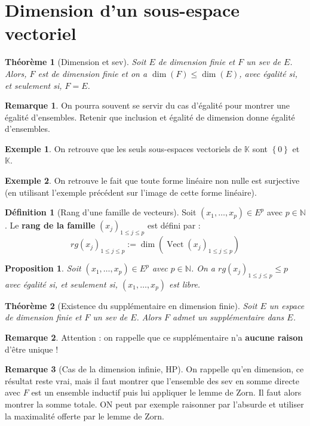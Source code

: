 \documentclass[french]{book}
\newcommand{\N}{\mathbb{N}}
\newcommand{\K}{\mathbb{K}}
\theoremstyle{plain}
\newtheorem{thm}{Théorème}[chapter]
\newtheorem{prop}{Proposition}[chapter]
\theoremstyle{definition}
\newtheorem{dfn}{Définition}[chapter]
\newtheorem{exa}{Exemple}[chapter]
\newtheorem{rmq}{Remarque}[chapter]
\theoremstyle{remark}
\DeclareMathOperator{\vect}{Vect}
\begin{document}
\section{Dimension d'un sous-espace vectoriel}
\begin{thm}[Dimension et sev]
	Soit $E$ de dimension finie et $F$ un sev de $E$. Alors, $F$ est de dimension finie et on a $\dim(F)\leqslant\dim(E)$, avec égalité si, et seulement si, $F=E$.
\end{thm}
\begin{rmq}
	On pourra souvent se servir du cas d'égalité pour montrer une égalité d'ensembles. Retenir que inclusion et égalité de dimension donne égalité d'ensembles.
\end{rmq}
\begin{exa}
	On retrouve que les seuls sous-espaces vectoriels de $\K$ sont $\left\{0\right\}$ et $\K$.
\end{exa}
\begin{exa}
	On retrouve le fait que toute forme linéaire non nulle est surjective (en utilisant l'exemple précédent sur l'image de cette forme linéaire).
\end{exa}
\begin{dfn}[Rang d'une famille de vecteurs]
	Soit $(x_1,\ldots,x_p)\in E^p$ avec $p\in\N$. Le \textbf{rang de la famille} $(x_j)_{1\leqslant j\leqslant p}$ est défini par : $$rg(x_j)_{1\leqslant j\leqslant p}:=\dim\left(\vect(x_j)_{1\leqslant j\leqslant p}\right)$$
\end{dfn}
\begin{prop}
	Soit $(x_1,\ldots,x_p)\in E^p$ avec $p\in\N$. On a $rg(x_j)_{1\leqslant j\leqslant p}\leqslant p$ avec égalité si, et seulement si, $(x_1,\ldots,x_p)$ est libre.
\end{prop}
\begin{thm}[Existence du supplémentaire en dimension finie]
	Soit $E$ un espace de dimension finie et $F$ un sev de $E$. Alors $F$ admet un supplémentaire dans $E$.
\end{thm}
\begin{rmq}
	Attention : on rappelle que ce supplémentaire n'a \textbf{aucune raison} d'être unique !
\end{rmq}
\begin{rmq}[Cas de la dimension infinie, HP]
	On rappelle qu'en dimension, ce résultat reste vrai, mais il faut montrer que l'ensemble des sev en somme directe avec $F$ est un ensemble inductif puis lui appliquer le lemme de Zorn. Il faut alors montrer la somme totale. ON peut par exemple raisonner par l'absurde et utiliser la maximalité offerte par le lemme de Zorn.
\end{rmq}
\end{document}

